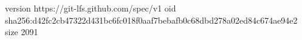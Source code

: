 version https://git-lfs.github.com/spec/v1
oid sha256:d42fc2cb47322d431bc6fc018f0aaf7bebafb0c68dbd278a02ed84c674ae94e2
size 2091
